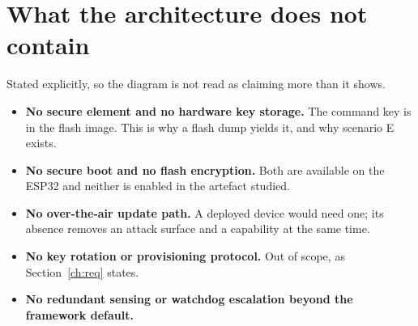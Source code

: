 \section{What the architecture does not contain}

Stated explicitly, so the diagram is not read as claiming more than it shows.

\begin{itemize}[leftmargin=1.6em,itemsep=4pt]
  \item \textbf{No secure element and no hardware key storage.} The command key is in the flash
        image. This is why a flash dump yields it, and why scenario E exists.
  \item \textbf{No secure boot and no flash encryption.} Both are available on the ESP32 and
        neither is enabled in the artefact studied.
  \item \textbf{No over-the-air update path.} A deployed device would need one; its absence
        removes an attack surface and a capability at the same time.
  \item \textbf{No key rotation or provisioning protocol.} Out of scope, as
        Section~\ref{ch:req} states.
  \item \textbf{No redundant sensing or watchdog escalation beyond the framework default.}
\end{itemize}
